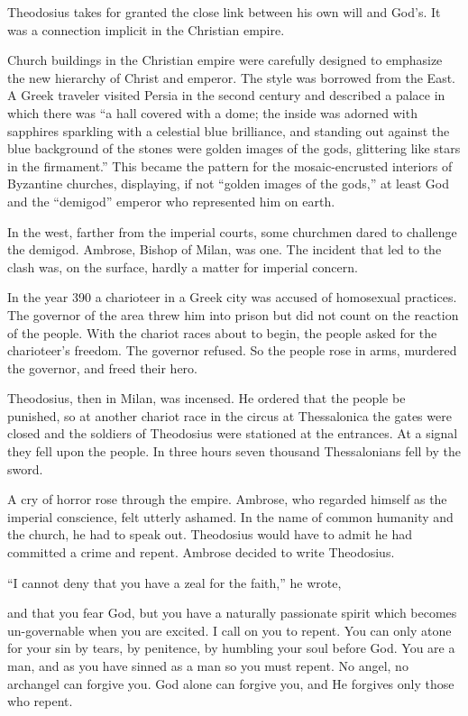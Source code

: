 Theodosius takes for granted the close link between his own will and God’s. It was a connection
implicit in the Christian empire.

Church buildings in the Christian empire were carefully designed to emphasize the new hierarchy of
Christ and emperor. The style was borrowed from the East. A Greek traveler visited Persia in the
second century and described a palace in which there was “a hall covered with a dome; the inside was
adorned with sapphires sparkling with a celestial blue brilliance, and standing out against the blue
background of the stones were golden images of the gods, glittering like stars in the firmament.”
This became the pattern for the mosaic-encrusted interiors of Byzantine churches, displaying, if not
“golden images of the gods,” at least God and the “demigod” emperor who represented him on earth.

In the west, farther from the imperial courts, some churchmen dared to challenge the demigod.
Ambrose, Bishop of Milan, was one. The incident that led to the clash was, on the surface, hardly a
matter for imperial concern.

In the year 390 a charioteer in a Greek city was accused of homosexual practices. The governor of
the area threw him into prison but did not count on the reaction of the people. With the chariot
races about to begin, the people asked for the charioteer’s freedom. The governor refused. So the
people rose in arms, murdered the governor, and freed their hero.

Theodosius, then in Milan, was incensed. He ordered that the people be punished, so at another
chariot race in the circus at Thessalonica the gates were closed and the soldiers of Theodosius were
stationed at the entrances. At a signal they fell upon the people. In three hours seven thousand
Thessalonians fell by the sword.

A cry of horror rose through the empire. Ambrose, who regarded himself as the imperial conscience,
felt utterly ashamed. In the name of common humanity and the church, he had to speak out. Theodosius
would have to admit he had committed a crime and repent. Ambrose decided to write Theodosius.

“I cannot deny that you have a zeal for the faith,” he wrote,

\begin{blockquote}
and that you fear God, but you have a naturally passionate spirit which becomes un-governable when
you are excited. I call on you to repent. You can only atone for your sin by tears, by penitence, by
humbling your soul before God. You are a man, and as you have sinned as a man so you must repent. No
angel, no archangel can forgive you. God alone can forgive you, and He forgives only those who
repent.
\end{blockquote}

